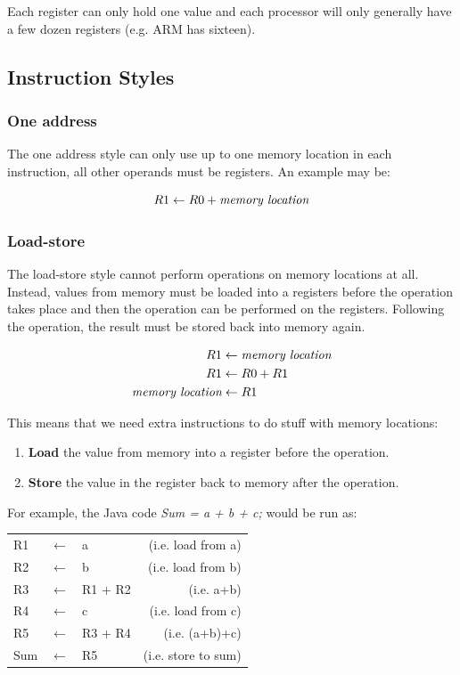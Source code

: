\documentclass{article}
\begin{document}
Each register can only hold one value and each processor will only generally have a few dozen registers (e.g. ARM has sixteen).

\subsection{Instruction Styles}

\subsubsection{One address}
The one address style can only use up to one memory location in each instruction, all other operands must be registers. An example may be:

\[
    R1 \leftarrow R0 + \textrm{\it memory location}
\]

\subsubsection{Load-store}
The load-store style cannot perform operations on memory locations at all. Instead, values from memory must be loaded into a registers before the operation takes place and then the operation can be performed on the registers. Following the operation, the result must be stored back into memory again.

\[
	\begin{split}
	    R1 &\leftarrow \textrm{\it memory location}\\
		R1 &\leftarrow R0 + R1\\
	    \textrm{\it memory location} &\leftarrow R1
    \end{split}
\]

This means that we need extra instructions to do stuff with memory locations:
\begin{enumerate}
	\item \textbf{Load} the value from memory into a register before the operation.
	\item \textbf{Store} the value in the register back to memory after the operation.
\end{enumerate}

For example, the Java code {\it Sum = a + b + c;} would be run as:

\begin{center}
    \begin{tabular}{l l l r}
        R1 & $\leftarrow$ & a & (i.e. load from a)\\
        R2 & $\leftarrow$ & b & (i.e. load from b)\\
        R3 & $\leftarrow$ & R1 + R2 & (i.e. a+b)\\
        R4 & $\leftarrow$ & c & (i.e. load from c)\\
        R5 & $\leftarrow$ & R3 + R4  & (i.e. (a+b)+c)\\
        Sum & $\leftarrow$ & R5 & (i.e. store to sum)\\
    \end{tabular}
\end{center}
\end{document}
